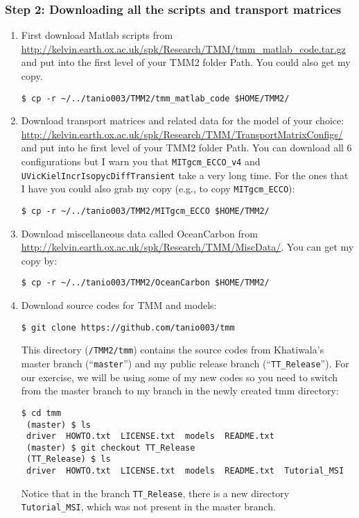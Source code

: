 \documentclass[a4paper]{article}
\begin{document}
\subsubsection{Step 2: Downloading all the scripts and transport matrices}
\begin{enumerate}
\item First download Matlab scripts from \\ 
\url{http://kelvin.earth.ox.ac.uk/spk/Research/TMM/tmm_matlab_code.tar.gz} and put into the first level of your TMM2 folder Path. You could also get my copy.
\begin{lstlisting}[style=DOS]
 $ cp -r ~/../tanio003/TMM2/tmm_matlab_code $HOME/TMM2/
\end{lstlisting}
\item Download transport matrices and related data for the model of your choice: \\ \url{http://kelvin.earth.ox.ac.uk/spk/Research/TMM/TransportMatrixConfigs/} and put into he first level of your TMM2 folder Path. You can download all 6 configurations but I warn you that \verb|MITgcm_ECCO_v4| and \verb|UVicKielIncrIsopycDiffTransient| take a very long time. For the ones that I have you could also grab my copy (e.g., to copy \verb|MITgcm_ECCO|):
\begin{lstlisting}[style=DOS]
 $ cp -r ~/../tanio003/TMM2/MITgcm_ECCO $HOME/TMM2/
\end{lstlisting}
\item Download miscellaneous data called OceanCarbon from \\ 
\url{http://kelvin.earth.ox.ac.uk/spk/Research/TMM/MiscData/}. You can get my copy by:
\begin{lstlisting}[style=DOS]
 $ cp -r ~/../tanio003/TMM2/OceanCarbon $HOME/TMM2/
\end{lstlisting}
\item Download source codes for TMM and models:
\begin{lstlisting}[style=DOS]
 $ git clone https://github.com/tanio003/tmm
\end{lstlisting}
 This directory (\verb|/TMM2/tmm|) contains the source codes from Khatiwala's master branch (``\verb|master|'') and my public release branch (``\verb|TT_Release|''). For our exercise, we will be using some of my new codes so you need to switch from the master branch to my branch in the newly created tmm directory:
\begin{lstlisting}[style=DOS]
 $ cd tmm
 (master) $ ls
 driver  HOWTO.txt  LICENSE.txt  models  README.txt
 (master) $ git checkout TT_Release
 (TT_Release) $ ls
 driver  HOWTO.txt  LICENSE.txt  models  README.txt  Tutorial_MSI
\end{lstlisting}
Notice that in the branch \verb|TT_Release|, there is a new directory \verb|Tutorial_MSI|, which was not present in the master branch. 


\end{enumerate}
\end{document}
